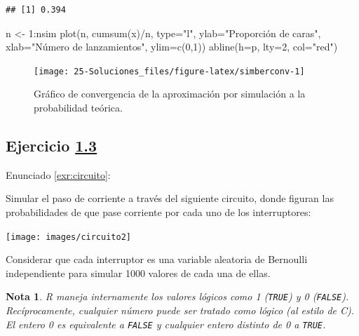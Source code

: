 \documentclass[
]{book}
\newenvironment{Shaded}{\begin{snugshade}}{\end{snugshade}}
\newcommand{\AttributeTok}[1]{\textcolor[rgb]{0.77,0.63,0.00}{#1}}
\newcommand{\DecValTok}[1]{\textcolor[rgb]{0.00,0.00,0.81}{#1}}
\newcommand{\FunctionTok}[1]{\textcolor[rgb]{0.00,0.00,0.00}{#1}}
\newcommand{\NormalTok}[1]{#1}
\newcommand{\OtherTok}[1]{\textcolor[rgb]{0.56,0.35,0.01}{#1}}
\newcommand{\SpecialCharTok}[1]{\textcolor[rgb]{0.00,0.00,0.00}{#1}}
\newcommand{\StringTok}[1]{\textcolor[rgb]{0.31,0.60,0.02}{#1}}
\theoremstyle{break}
\theoremstyle{nonumberplain}
\newtheorem{remark}{Nota}
\begin{document}
\begin{verbatim}
## [1] 0.394
\end{verbatim}

\begin{Shaded}
\begin{Highlighting}[]
\NormalTok{n }\OtherTok{\textless{}{-}} \DecValTok{1}\SpecialCharTok{:}\NormalTok{nsim}
\FunctionTok{plot}\NormalTok{(n, }\FunctionTok{cumsum}\NormalTok{(x)}\SpecialCharTok{/}\NormalTok{n, }\AttributeTok{type=}\StringTok{"l"}\NormalTok{, }\AttributeTok{ylab=}\StringTok{"Proporción de caras"}\NormalTok{, }
     \AttributeTok{xlab=}\StringTok{"Número de lanzamientos"}\NormalTok{, }\AttributeTok{ylim=}\FunctionTok{c}\NormalTok{(}\DecValTok{0}\NormalTok{,}\DecValTok{1}\NormalTok{))}
\FunctionTok{abline}\NormalTok{(}\AttributeTok{h=}\NormalTok{p, }\AttributeTok{lty=}\DecValTok{2}\NormalTok{, }\AttributeTok{col=}\StringTok{"red"}\NormalTok{)}
\end{Highlighting}
\end{Shaded}

\begin{figure}[!htb]

{\centering \texttt{[image: 25-Soluciones\_files/figure-latex/simberconv-1]} 

}

\caption{Gráfico de convergencia de la aproximación por simulación a la probabilidad teórica.}\label{fig:simberconv}
\end{figure}

\hypertarget{sol-circuito}{%
\subsection{\texorpdfstring{Ejercicio \href{ejercicios.html\#exr:circuito}{1.3}}{Ejercicio 1.3}}\label{sol-circuito}}

Enunciado \ref{exr:circuito}:

Simular el paso de corriente a través del siguiente circuito, donde
figuran las probabilidades de que pase corriente por cada uno de los
interruptores:

\begin{center}\texttt{[image: images/circuito2]} \end{center}

Considerar que cada interruptor es una variable aleatoria de Bernoulli independiente
para simular 1000 valores de cada una de ellas.

\begin{remark}
R maneja internamente los valores lógicos como 1 (\texttt{TRUE}) y 0 (\texttt{FALSE}).
Recíprocamente, cualquier número puede ser tratado como lógico (al estilo de C).
El entero 0 es equivalente a \texttt{FALSE} y cualquier entero distinto de 0 a \texttt{TRUE}.
\end{remark}
\end{document}
